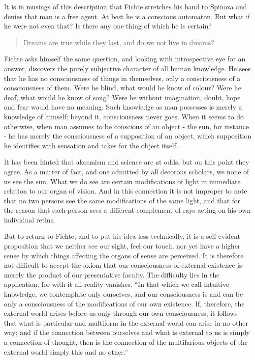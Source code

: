 \documentclass[]{book}
\begin{document}
It is in musings of this description that Fichte stretches his hand to
Spinoza and denies that man is a free agent. At best he is a conscious
automaton. But what if he were not even that? Is there any one thing of
which he is certain?

\begin{quote}
Dreams are true while they last, and do we not live in dreams?
\end{quote}

Fichte asks himself the same question, and looking with introspective
eye for an answer, discovers the purely subjective character of all
human knowledge. He sees that he has no consciousness of things in
themselves, only a consciousness of a consciousness of them. Were he
blind, what would he know of colour? Were he deaf, what would he know of
song? Were he without imagination, doubt, hope and fear would have no
meaning. Such knowledge as man possesses is merely a knowledge of
himself; beyond it, consciousness never goes. When it seems to do
otherwise, when man assumes to be conscious of an object - the sun, for
instance - he has merely the consciousness of a supposition of an
object, which supposition he identifies with sensation and takes for the
object itself.

It has been hinted that akosmism and science are at odds, but on this
point they agree. As a matter of fact, and one admitted by all decorous
scholars, we none of us see the sun. What we do see are certain
modifications of light in immediate relation to our organ of vision. And
in this connection it is not improper to note that no two persons see
the same modifications of the same light, and that for the reason that
each person sees a different complement of rays acting on his own
individual retina.

But to return to Fichte, and to put his idea less technically, it is a
self-evident proposition that we neither see our sight, feel our touch,
nor yet have a higher sense by which things affecting the organs of
sense are perceived. It is therefore not difficult to accept the axiom
that our consciousness of external existence is merely the product of
our presentative faculty. The difficulty lies in the application, for
with it all reality vanishes. ``In that which we call intuitive
knowledge, we contemplate only ourselves, and our consciousness is and
can be only a consciousness of the modifications of our own existence.
If, therefore, the external world arises before us only through our own
consciousness, it follows that what is particular and multiform in the
external world can arise in no other way; and if the connection between
ourselves and what is external to us is simply a connection of thought,
then is the connection of the multifarious objects of the external world
simply this and no other.''
\end{document}
